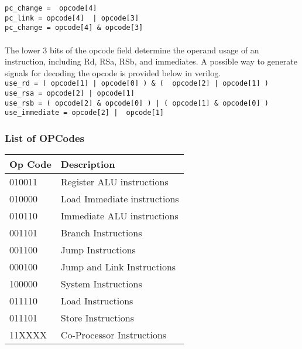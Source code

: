 \documentclass[letterpaper, 11pt]{article}
\begin{document}
\texttt{pc\_change = ~opcode[4]}\\
\texttt{pc\_link = opcode[4] ~| opcode[3]}\\
\texttt{pc\_change = opcode[4] \& opcode[3]}\\

\paragraph{} The lower 3 bits of the opcode field determine the operand usage of an instruction, including Rd, RSa, RSb, and immediates.
A possible way to generate signals for decoding the opcode is provided below in verilog. \\

\texttt{use\_rd = ( opcode[1] | opcode[0] ) \& ( ~opcode[2] | opcode[1] ) }\\
\texttt{use\_rsa = opcode[2] | opcode[1] }\\
\texttt{use\_rsb = ( opcode[2] \& opcode[0] ) | ( opcode[1] \& opcode[0] ) }\\
\texttt{use\_immediate = opcode[2] | ~opcode[1] }\\



\subsubsection{List of OPCodes}
	\begin{center}
		\begin{tabular}{|l|l|}
			\hline
			Op Code & Description 				 	\\ \hline
			010011	& Register ALU instructions	 	\\ \hline
			010000	& Load Immediate instructions 	\\ \hline
			010110	& Immediate ALU instructions	\\ \hline
			001101	& Branch Instructions			\\ \hline
			001100	& Jump Instructions				\\ \hline
			000100	& Jump and Link Instructions	\\ \hline
			100000	& System Instructions			\\ \hline
			011110	& Load Instructions				\\ \hline
			011101	& Store Instructions			\\ \hline
			11XXXX	& Co-Processor Instructions		\\ \hline

		\end{tabular}
	\end{center}
\end{document}
